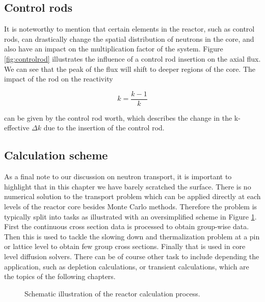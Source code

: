 \subsection{Control rods}

It is noteworthy to mention that certain elements in the reactor, such as control rods, can drastically change the spatial distribution of neutrons in the core, and also have an impact on the multiplication factor of the system. Figure \ref{fig:controlrod} illustrates the influence of a control rod insertion on the axial flux. We can see that the peak of the flux will shift to deeper regions of the core. The impact of the rod on the reactivity 

\[
k=\frac{k-1}{k}
\]

\noindent can be given by the control rod worth, which describes the change in the k-effective $\Delta k$ due to the insertion of the control rod.  

\subsection{Calculation scheme}

As a final note to our discussion on neutron transport, it is important to highlight that in this chapter we have barely scratched the surface. There is no numerical solution to the transport problem which can be applied directly at each levels of the reactor core besides Monte Carlo methods. Therefore the problem is typically split into tasks as illustrated with an oversimplified scheme in Figure \ref{fig:calculationscheme}. First the continuous cross section data is processed to obtain group-wise data. Then this is used to tackle the slowing down and thermalization problem at a pin or lattice level to obtain few group cross sections. Finally that is used in core level diffusion solvers. There can be of course other task to include depending the application, such as depletion calculations, or transient calculations, which are the topics of the following chapters.

\begin{figure}[ht!]
\protect {}\protect
\caption{\label{fig:calculationscheme} \footnotesize{Schematic illustration of the reactor calculation process.}}
\end{figure} 


%
